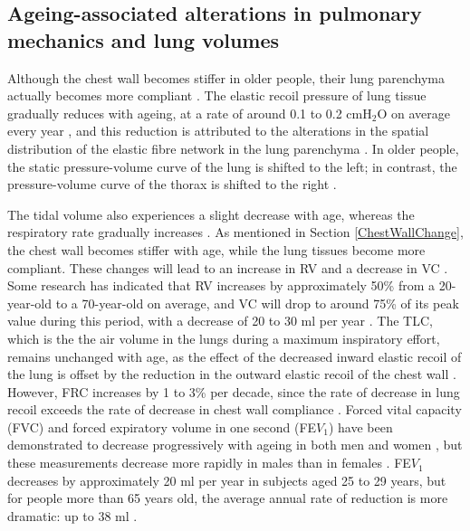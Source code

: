 \subsection{Ageing-associated alterations in pulmonary mechanics and lung volumes}
Although the chest wall becomes stiffer in older people, their lung parenchyma actually becomes more compliant \citep{mittman1965relationship, turner1968elasticity, zaugg2000respiratory}. The elastic recoil pressure of lung tissue gradually reduces with ageing, at a rate of around 0.1 to 0.2 $\mathrm{cmH_2O}$ on average every year \citep{turner1968elasticity}, and this reduction is attributed to the alterations in the spatial distribution of the elastic fibre network in the lung parenchyma \citep{sprung2006age}. In older people, the static pressure-volume curve of the lung is shifted to the left; in contrast, the pressure-volume curve of the thorax is shifted to the right \citep{zaugg2000respiratory,sprung2006age}.

The tidal volume also experiences a slight decrease with age, whereas the respiratory rate gradually increases \citep{sprung2006age}. As mentioned in Section \ref{ChestWallChange}, the chest wall becomes stiffer with age, while the lung tissues become more compliant. These changes will lead to an increase in RV and a decrease in VC \citep{lalley2013aging}. Some research has indicated that RV increases by approximately 50\% from a 20-year-old to a 70-year-old on average, and VC will drop to around 75\% of its peak value during this period, with a decrease of 20 to 30 ml per year \citep{janssens1999physiological, sprung2006age}. The TLC, which is the the air volume in the lungs during a maximum inspiratory effort, remains unchanged with age, as the effect of the decreased inward elastic recoil of the lung is offset by the reduction in the outward elastic recoil of the chest wall \citep{sprung2006age}. However, FRC increases by 1 to 3\% per decade, since the rate of decrease in lung recoil exceeds the rate of decrease in chest wall compliance \citep{janssens1999physiological, lalley2013aging}. Forced vital capacity (FVC) and forced expiratory volume in one second (FE$V_1$) have been demonstrated to decrease progressively with ageing in both men and women \citep{knudson1976maximal}, but these measurements decrease more rapidly in males than in females \citep{crapo1993aging}. FE$V_1$ decreases by approximately 20 ml per year in subjects aged 25 to 29 years, but for people more than 65 years old, the average annual rate of reduction is more dramatic: up to 38 ml \citep{brandstetter1983aging}.

